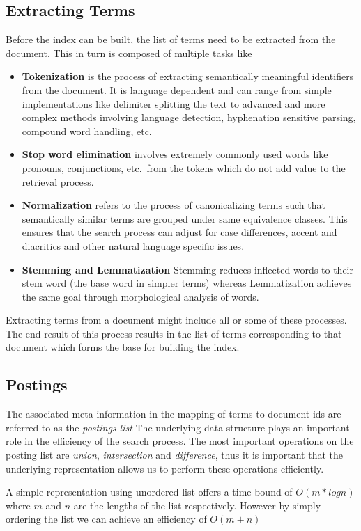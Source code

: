 \subsection{Extracting Terms}
\label{terms}
Before the index can be built, the list of terms need to be extracted from the document. This in turn is composed of multiple tasks like
\begin{itemize}
  \item \textbf{Tokenization} is the process of extracting semantically meaningful identifiers from the document.
    It is language dependent and can range from simple implementations like delimiter splitting the text to advanced and more complex
    methods involving language detection, hyphenation sensitive parsing, compound word handling, etc.
  \item \textbf{Stop word elimination} involves extremely commonly used words like pronouns, conjunctions, etc.\ from the tokens which do
    not add value to the retrieval process.
  \item \textbf{Normalization} refers to the process of canonicalizing terms such that semantically similar terms are grouped under
    same equivalence classes. This ensures that the search process can adjust for case differences, accent and diacritics and other
    natural language specific issues.
  \item \textbf{Stemming and Lemmatization} Stemming reduces inflected words to their stem word (the base word in simpler terms) whereas
    Lemmatization achieves the same goal through morphological analysis of words.
\end{itemize}
Extracting terms from a document might include all or some of these processes.
The end result of this process results in the list of terms corresponding to that document which forms the base for building the index.


\subsection{Postings}
\label{postings}
The associated meta information in the mapping of terms to document ids are referred to as the \textit{postings list}
The underlying data structure plays an important role in the efficiency of the search process.
The most important operations on the posting list are \textit{union}, \textit{intersection} and \textit{difference},
thus it is important that the underlying representation allows us to perform these operations efficiently.

A simple representation using unordered list offers a time bound of $O(m*log n)$ where $m$ and $n$ are the lengths of the list respectively.
However by simply ordering the list we can achieve an efficiency of $O(m + n)$


